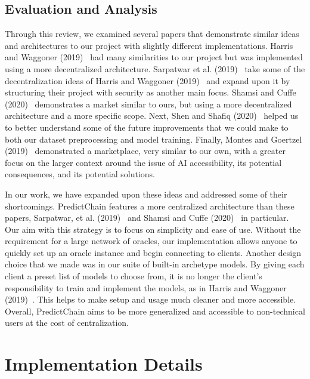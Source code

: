 \documentclass{ledger}
\begin{document}
\subsection{Evaluation and Analysis}

Through this review, we examined several papers that demonstrate similar ideas and architectures to our project
with slightly different implementations.  Harris and Waggoner (2019)~\cite{sharingModels} had many similarities to our
project but was implemented using a more decentralized architecture.  Sarpatwar et al. (2019)~\cite{priceOfTrust} take
some of the decentralization ideas of Harris and Waggoner (2019)~\cite{sharingModels} and expand upon it by structuring
their project with security as another main focus.  Shamsi and Cuffe (2020)~\cite{windForcasting} demonstrates a market
similar to ours, but using a more decentralized architecture and a more specific scope.  Next, Shen and Shafiq
(2020)~\cite{deepPrediction} helped us to better understand some of the future improvements that we could make
to both our dataset preprocessing and model training.  Finally, Montes and Goertzel (2019)~\cite{democratizedAI}
demonstrated a marketplace, very similar to our own, with a greater focus on the larger context around the issue of
AI accessibility, its potential consequences, and its potential solutions.

In our work, we have expanded upon these ideas and addressed some of their shortcomings.  PredictChain features a more
centralized architecture than these papers, Sarpatwar, et al. (2019)~\cite{priceOfTrust} and Shamsi and Cuffe
(2020)~\cite{windForcasting} in particular. Our aim with this strategy is to focus on simplicity and ease of use.  Without
the requirement for a large network of oracles, our implementation allows anyone to quickly set up an oracle instance and
begin connecting to clients.  Another design choice that we made was in our suite of built-in archetype models.  By giving
each client a preset list of models to choose from, it is no longer the client's responsibility to train and implement
the models, as in Harris and Waggoner (2019)~\cite{sharingModels}.  This helps to make setup and usage much cleaner and
more accessible.  Overall, PredictChain aims to be more generalized and accessible to non-technical users at the cost of
centralization.

\section{Implementation Details}
\end{document}
